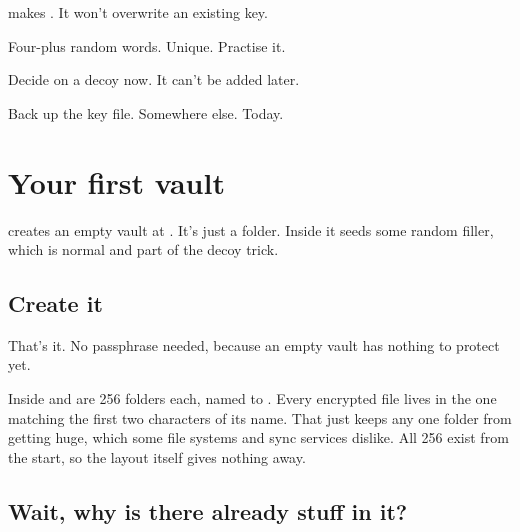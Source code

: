 \documentclass[10pt,oneside,openany]{book}
\begin{document}
\begin{pocket}
\begin{pocketlist}
  \item {} makes . It won't overwrite an existing key.
  \item Four-plus random words. Unique. Practise it.
  \item Decide on a decoy now. It can't be added later.
  \item Back up the key file. Somewhere else. Today.
\end{pocketlist}
\end{pocket}

\chapter{Your first vault}

\begin{tldr}
 creates an empty vault at . It's
just a folder. Inside it seeds some random filler, which is normal and part of
the decoy trick.
\end{tldr}

\section{Create it}


That's it. No passphrase needed, because an empty vault has nothing to
protect yet.


Inside  and  are 256 folders each, named
 to . Every encrypted file lives in the one matching the
first two characters of its name. That just keeps any one folder from
getting huge, which some file systems and sync services dislike. All 256
exist from the start, so the layout itself gives nothing away.

\section{Wait, why is there already stuff in it?}
\end{document}
